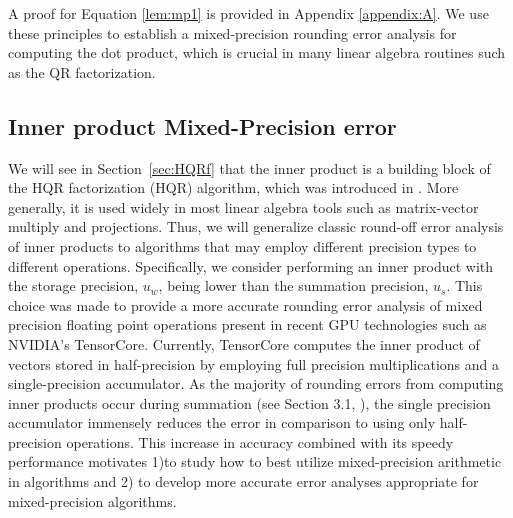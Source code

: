 \documentclass[review,onefignum,onetabnum]{siamart190516}
\begin{document}
A proof for Equation \ref{lem:mp1} is provided in Appendix \ref{appendix:A}.
We use these principles to establish a mixed-precision rounding error analysis for computing the dot product, which is crucial in many linear algebra routines such as the QR factorization.
\subsection{Inner product Mixed-Precision error}
\label{ssec:IP}
We will see in Section~\ref{sec:HQRf} that the inner product is a building block of the HQR factorization (HQR) algorithm, which was introduced in \cite{Householder1958}.
More generally, it is used widely in most linear algebra tools such as matrix-vector multiply and projections.
Thus, we will generalize classic round-off error analysis of inner products to algorithms that may employ different precision types to different operations. 
Specifically, we consider performing an inner product with the storage precision, $u_w$, being lower than the summation precision, $u_s$.
This choice was made to provide a more accurate rounding error analysis of mixed precision floating point operations present in recent GPU technologies such as NVIDIA's TensorCore. 
Currently, TensorCore computes the inner product of vectors stored in half-precision by employing full precision multiplications and a single-precision accumulator. 
As the majority of rounding errors from computing inner products occur during summation (see Section 3.1, \cite{Higham2002}), the single precision accumulator immensely reduces the error in comparison to using only half-precision operations.
This increase in accuracy combined with its speedy performance motivates 1)to study how to best utilize mixed-precision arithmetic in algorithms and 2) to develop more accurate error analyses appropriate for mixed-precision algorithms.
\end{document}
